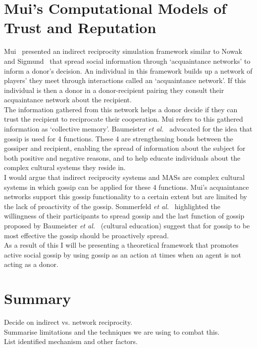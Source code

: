 \documentclass[]{final_report}
\begin{document}
\section{Mui's Computational Models of Trust and Reputation}
Mui~\cite{mui2002computational} presented an indirect reciprocity simulation framework similar to Nowak and Sigmund~\cite{evol_indirect_image} that spread social information through `acquaintance networks' to inform a donor's decision. An individual in this framework builds up a network of players' they meet through interactions called an `acquaintance network'. If this individual is then a donor in a donor-recipient pairing they consult their acquaintance network about the recipient.\\
The information gathered from this network helps a donor decide if they can trust the recipient to reciprocate their cooperation. Mui refers to this gathered information as `collective memory'. Baumeister \textit{et al.}~\cite{baumeister2004gossip} advocated for the idea that gossip is used for 4 functions. These 4 are strengthening bonds between the gossiper and recipient, enabling the spread of information about the subject for both positive and negative reasons, and to help educate individuals about the complex cultural systems they reside in.\\
I would argue that indirect reciprocity systems and MASs are complex cultural systems in which gossip can be applied for these 4 functions. Mui's acquaintance networks support this gossip functionality to a certain extent but are limited by the lack of proactivity of the gossip. Sommerfeld \textit{et al.}~\cite{gossip_alt} highlighted the willingness of their participants to spread gossip and the last function of gossip proposed by Baumeister \textit{et al.}~\cite{baumeister2004gossip} (cultural education) suggest that for gossip to be most effective the gossip should be proactively spread.\\
As a result of this I will be presenting a theoretical framework that promotes active social gossip by using gossip as an action at times when an agent is not acting as a donor. 

\section{Summary}
Decide on indirect vs. network reciprocity.\\
Summarise limitations and the techniques we are using to combat this.\\
List identified mechanism and other factors.
\end{document}
